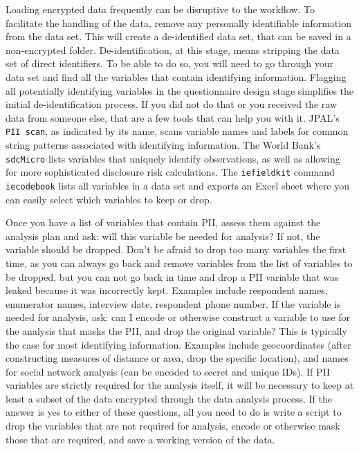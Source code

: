 Loading encrypted data frequently can be disruptive to the workflow.
To facilitate the handling of the data, remove any personally identifiable information from the data set.
This will create a de-identified data set, that can be saved in a non-encrypted folder.
De-identification,
at this stage, means stripping the data set of direct identifiers.
To be able to do so, you will need to go through your data set and
find all the variables that contain identifying information.
Flagging all potentially identifying variables in the questionnaire design stage
simplifies the initial de-identification process.
If you did not do that or you received the raw data from someone else, that are a few tools that can help you with it.
JPAL's \texttt{PII scan}, as indicated by its name,
scans variable names and labels for common string patterns associated with identifying information.
The World Bank's \texttt{sdcMicro}
lists variables that uniquely identify observations,
as well as allowing for more sophisticated disclosure risk calculations.
The \texttt{iefieldkit} command \texttt{iecodebook}
lists all variables in a data set and exports an Excel sheet
where you can easily select which variables to keep or drop.

Once you have a list of variables that contain PII,
assess them against the analysis plan and ask:
will this variable be needed for analysis?
If not, the variable should be dropped.
Don't be afraid to drop too many variables the first time,
as you can always go back and remove variables from the list of variables to be dropped,
but you can not go back in time and drop a PII variable that was leaked
because it was incorrectly kept.
Examples include respondent names, enumerator names, interview date, respondent phone number.
If the variable is needed for analysis, ask:
can I encode or otherwise construct a variable to use for the analysis that masks the PII,
and drop the original variable?
This is typically the case for most identifying information.
Examples include geocoordinates
(after constructing measures of distance or area,
drop the specific location),
and names for social network analysis (can be encoded to secret and unique IDs).
If PII variables are strictly required for the analysis itself,
it will be necessary to keep at least a subset of the data encrypted through the data analysis process.
If the answer is yes to either of these questions,
all you need to do is write a script to drop the variables that are not required for analysis,
encode or otherwise mask those that are required,
and save a working version of the data.

